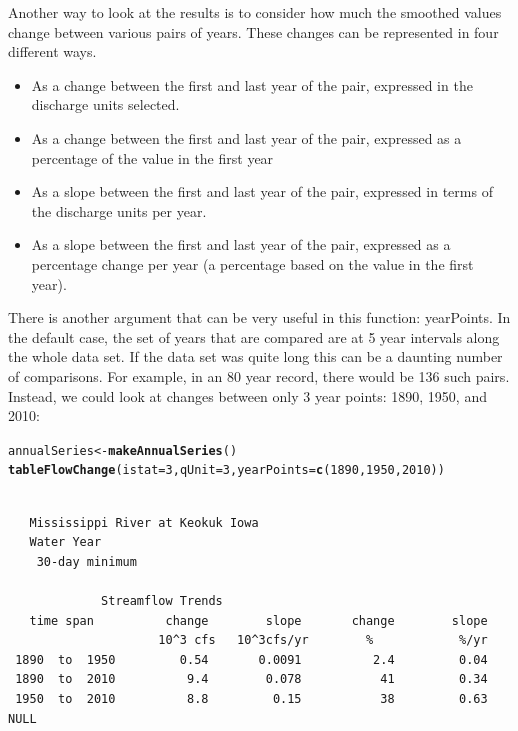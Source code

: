 \documentclass[a4paper,11pt]{article}\usepackage[]{graphicx}\usepackage[]{color}
\makeatletter
\newcommand{\hlnum}[1]{\textcolor[rgb]{0.686,0.059,0.569}{#1}}%
\newcommand{\hlstd}[1]{\textcolor[rgb]{0.345,0.345,0.345}{#1}}%
\newcommand{\hlkwb}[1]{\textcolor[rgb]{0.69,0.353,0.396}{#1}}%
\newcommand{\hlkwc}[1]{\textcolor[rgb]{0.333,0.667,0.333}{#1}}%
\newcommand{\hlkwd}[1]{\textcolor[rgb]{0.737,0.353,0.396}{\textbf{#1}}}%
\newenvironment{kframe}{%
 \def\at@end@of@kframe{}%
 \ifinner\ifhmode%
  \def\at@end@of@kframe{\end{minipage}}%
  \begin{minipage}{\columnwidth}%
 \fi\fi%
 \def\FrameCommand##1{\hskip\@totalleftmargin \hskip-\fboxsep
 \colorbox{shadecolor}{##1}\hskip-\fboxsep
     \hskip-\linewidth \hskip-\@totalleftmargin \hskip\columnwidth}%
 \MakeFramed {\advance\hsize-\width
   \@totalleftmargin\z@ \linewidth\hsize
   \@setminipage}}%
 {\par\unskip\endMakeFramed%
 \at@end@of@kframe}
\newenvironment{knitrout}{}{} %
\makeatother
\begin{document}
Another way to look at the results is to consider how much the smoothed values change between various pairs of years.  These changes can be represented in four different ways.  
\begin{itemize}
  \item As a change between the first and last year of the pair, expressed in the discharge units selected.
  \item As a change between the first and last year of the pair, expressed as a percentage of the value in the first year
  \item As a slope between the first and last year of the pair, expressed in terms of the discharge units per year.
  \item As a slope between the first and last year of the pair, expressed as a percentage change per year (a percentage based on the value in the first year).
\end{itemize}

There is another argument that can be very useful in this function: yearPoints.  In the default case, the set of years that are compared are at 5 year intervals along the whole data set.  If the data set was quite long this can be a daunting number of comparisons.  For example, in an 80 year record, there would be 136 such pairs. Instead, we could look at changes between only 3 year points: 1890, 1950, and 2010: 


\begin{knitrout}
\color{fgcolor}\begin{kframe}
\begin{alltt}
\hlstd{annualSeries} \hlkwb{<-} \hlkwd{makeAnnualSeries}\hlstd{()}
\hlkwd{tableFlowChange}\hlstd{(}\hlkwc{istat}\hlstd{=}\hlnum{3}\hlstd{,} \hlkwc{qUnit}\hlstd{=}\hlnum{3}\hlstd{,}\hlkwc{yearPoints}\hlstd{=}\hlkwd{c}\hlstd{(}\hlnum{1890}\hlstd{,}\hlnum{1950}\hlstd{,}\hlnum{2010}\hlstd{))}
\end{alltt}
\begin{verbatim}

   Mississippi River at Keokuk Iowa
   Water Year
    30-day minimum 

             Streamflow Trends
   time span          change        slope       change        slope
                     10^3 cfs   10^3cfs/yr        %            %/yr
 1890  to  1950         0.54       0.0091          2.4         0.04
 1890  to  2010          9.4        0.078           41         0.34
 1950  to  2010          8.8         0.15           38         0.63
NULL
\end{verbatim}
\end{kframe}
\end{knitrout}
\end{document}
